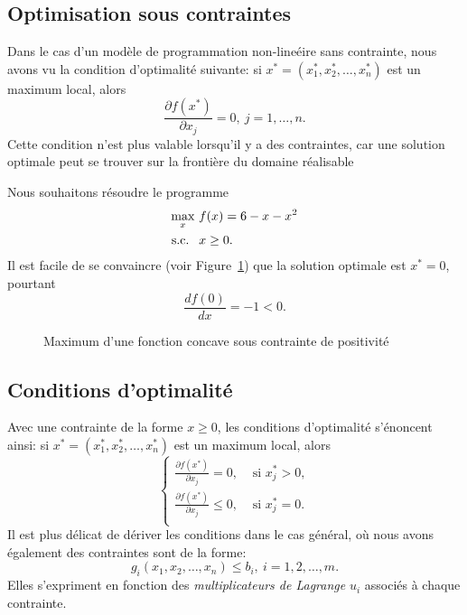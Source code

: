 \subsection{Optimisation sous contraintes}

Dans le cas d'un modèle de programmation non-lineéire sans contrainte, nous avons vu la condition d'optimalité suivante: si $x^* = (x_1^*, x_2^*,\ldots, x_n^*)$ est un maximum local, alors
\[
\frac{\partial f(x^*)}{\partial x_j} = 0,\ j = 1,\ldots,n.
\]
Cette condition n'est plus valable lorsqu'il y a des contraintes, car une solution optimale peut se trouver sur la frontière du domaine réalisable

\begin{example}
Nous souhaitons résoudre le programme
\begin{align*}
\max_x\ & f(x) = 6-x-x^2 \\
\mbox{s.c. }\ & x \geq 0. 
\end{align*}
Il est facile de se convaincre (voir Figure~\ref{fig:concavity_positivity}) que la solution optimale est $x^* = 0$, pourtant
\[
\frac{df(0)}{dx} = -1 < 0.
\]
\begin{figure}[htb]
\begin{center}
\end{center}
\caption{Maximum d'une fonction concave sous contrainte de positivité}
\label{fig:concavity_positivity}
\end{figure}
\end{example}

\subsection{Conditions d'optimalité}

Avec une contrainte de la forme $x \geq 0$, les conditions d'optimalité s'énoncent ainsi: si $x^* = (x_1^*, x_2^*,\ldots, x_n^*)$ est un maximum local, alors
\[
\begin{cases}
\frac{\partial f(x^*)}{\partial x_j} = 0,& \mbox{ si } x_j^* > 0, \\
\frac{\partial f(x^*)}{\partial x_j} \leq 0,& \mbox{ si } x_j^* = 0. \\
\end{cases}
\]
Il est plus délicat de dériver les conditions dans le cas général, où nous avons également des contraintes sont de la forme:
\[
g_i(x_1,x_2,\ldots,x_n) \leq b_i,\ i = 1,2,\ldots,m.
\]
Elles s'expriment en fonction des {\sl multiplicateurs de Lagrange} $u_i$ associés à chaque contrainte.


